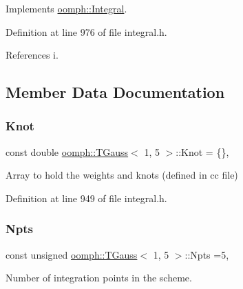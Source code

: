 Implements \hyperlink{classoomph_1_1Integral_ac65335e2aab120b285b3d6c294507b06}{oomph\+::\+Integral}.



Definition at line 976 of file integral.\+h.



References i.



\subsection{Member Data Documentation}
\mbox{\label{classoomph_1_1TGauss_3_011_00_015_01_4_a9aad9d3db2a62676a8ab40d3e549d43f}} 
\subsubsection{\texorpdfstring{Knot}{Knot}}
{\footnotesize\ttfamily const double \hyperlink{classoomph_1_1TGauss}{oomph\+::\+T\+Gauss}$<$ 1, 5 $>$\+::Knot = \{\}\hspace{0.3cm}{\ttfamily [static]}, {\ttfamily [private]}}



Array to hold the weights and knots (defined in cc file) 



Definition at line 949 of file integral.\+h.

\mbox{\label{classoomph_1_1TGauss_3_011_00_015_01_4_a084afcbba5a00a9c929c5e865474b921}} 
\subsubsection{\texorpdfstring{Npts}{Npts}}
{\footnotesize\ttfamily const unsigned \hyperlink{classoomph_1_1TGauss}{oomph\+::\+T\+Gauss}$<$ 1, 5 $>$\+::Npts =5\hspace{0.3cm}{\ttfamily [static]}, {\ttfamily [private]}}



Number of integration points in the scheme. 



